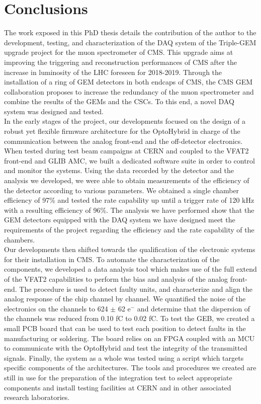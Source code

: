 \chapter*{Conclusions}
\label{chap:IV-0-conclusions}

  The work exposed in this PhD thesis details the contribution of the author to the development, testing, and characterization of the DAQ system of the Triple-GEM upgrade project for the muon spectrometer of CMS. This upgrade aims at improving the triggering and reconstruction performances of CMS after the increase in luminosity of the LHC foreseen for 2018-2019. Through the installation of a ring of GEM detectors in both endcaps of CMS, the CMS GEM collaboration proposes to increase the redundancy of the muon spectrometer and combine the results of the GEMs and the CSCs. To this end, a novel DAQ system was designed and tested. \\

  In the early stages of the project, our developments focused on the design of a robust yet flexible firmware architecture for the OptoHybrid in charge of the communication between the analog front-end and the off-detector electronics. When tested during test beam campaigns at CERN and coupled to the VFAT2 front-end and GLIB AMC, we built a dedicated software suite in order to control and monitor the systems. Using the data recorded by the detector and the analysis we developed, we were able to obtain measurements of the efficiency of the detector according to various parameters. We obtained a single chamber efficiency of 97\% and tested the rate capability up until a trigger rate of 120 kHz with a resulting efficiency of 96\%. The analysis we have performed show that the GEM detectors equipped with the DAQ system we have designed meet the requirements of the project regarding the efficiency and the rate capability of the chambers. \\

  Our developments then shifted towards the qualification of the electronic systems for their installation in CMS. To automate the characterization of the components, we developed a data analysis tool which makes use of the full extend of the VFAT2 capabilities to perform the bias and analysis of the analog front-end. The procedure is used to detect faulty units, and characterize and align the analog response of the chip channel by channel. We quantified the noise of the electronics on the channels to 624 $\pm$ 62 e$^-$ and determine that the dispersion of the channels was reduced from 0.10 fC to 0.02 fC. To test the GEB, we created a small PCB board that can be used to test each position to detect faults in the manufacturing or soldering. The board relies on an FPGA coupled with an MCU to communicate with the OptoHybrid and test the integrity of the transmitted signals. Finally, the system as a whole was tested using a script which targets specific components of the architectures. The tools and procedures we created are still in use for the preparation of the integration test to select appropriate components and install testing facilities at CERN and in other associated research laboratories. \\

